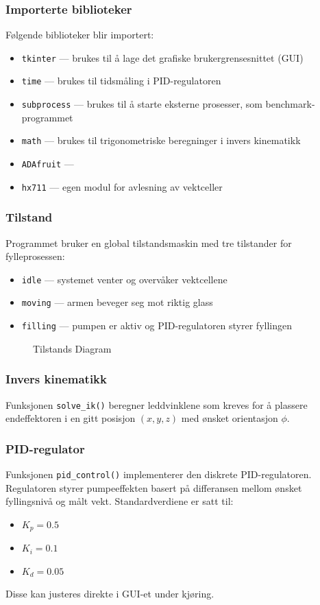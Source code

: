 \subsubsection{Importerte biblioteker}
Følgende biblioteker blir importert:
\begin{itemize}
    \item \texttt{tkinter} — brukes til å lage det grafiske brukergrensesnittet (GUI)
    \item \texttt{time} — brukes til tidsmåling i PID-regulatoren
    \item \texttt{subprocess} — brukes til å starte eksterne prosesser, 
          som benchmark-programmet
    \item \texttt{math} — brukes til trigonometriske beregninger i invers kinematikk
    \item \texttt{ADAfruit} — 
    \item \texttt{hx711} — egen modul for avlesning av vektceller
\end{itemize}

\subsubsection{Tilstand}
Programmet bruker en global tilstandsmaskin med tre tilstander for fylleprosessen:
\begin{itemize}
    \item \texttt{idle} — systemet venter og overvåker vektcellene
    \item \texttt{moving} — armen beveger seg mot riktig glass
    \item \texttt{filling} — pumpen er aktiv og PID-regulatoren styrer fyllingen
\end{itemize}

\begin{figure}[H]
    \centering
    
    \caption{Tilstands Diagram}
    \label{fig:Tilstandsdiagram}
\end{figure}

\subsubsection{Invers kinematikk}
Funksjonen \texttt{solve\_ik()} beregner leddvinklene som kreves for å 
plassere endeffektoren i en gitt posisjon $(x, y, z)$ med ønsket 
orientasjon $\phi$.

\subsubsection{PID-regulator}
Funksjonen \texttt{pid\_control()} implementerer den diskrete PID-regulatoren. Regulatoren styrer pumpeeffekten 
basert på differansen mellom ønsket fyllingsnivå og målt vekt. 
Standardverdiene er satt til:
\begin{itemize}
    \item $K_p = 0.5$
    \item $K_i = 0.1$
    \item $K_d = 0.05$
\end{itemize}
Disse kan justeres direkte i GUI-et under kjøring.

